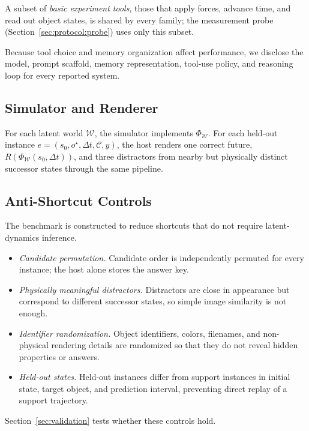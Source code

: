 
A subset of \emph{basic experiment tools}, those that apply forces, advance time, and read out object states, is shared by every family; the measurement probe (Section~\ref{sec:protocol:probe}) uses only this subset.

Because tool choice and memory organization affect performance, we disclose the model, prompt scaffold, memory representation, tool-use policy, and reasoning loop for every reported system.

\subsection{Simulator and Renderer}


For each latent world $\mathcal{W}$, the simulator implements $\Phi_{\mathcal{W}}$. For each held-out instance $e=(s_0,o^\star,\Delta t,\mathcal{C},y)$, the host renders one correct future, $R(\Phi_{\mathcal{W}}(s_0,\Delta t))$, and three distractors from nearby but physically distinct successor states through the same pipeline.

\subsection{Anti-Shortcut Controls}
\label{sec:construction:antishortcut}

The benchmark is constructed to reduce shortcuts that do not require latent-dynamics inference.
\begin{itemize}
  \item \emph{Candidate permutation.} Candidate order is independently permuted for every instance; the host alone stores the answer key.
  \item \emph{Physically meaningful distractors.} Distractors are close in appearance but correspond to different successor states, so simple image similarity is not enough.
  \item \emph{Identifier randomization.} Object identifiers, colors, filenames, and non-physical rendering details are randomized so that they do not reveal hidden properties or answers.
  \item \emph{Held-out states.} Held-out instances differ from support instances in initial state, target object, and prediction interval, preventing direct replay of a support trajectory.
\end{itemize}
Section~\ref{sec:validation} tests whether these controls hold.

